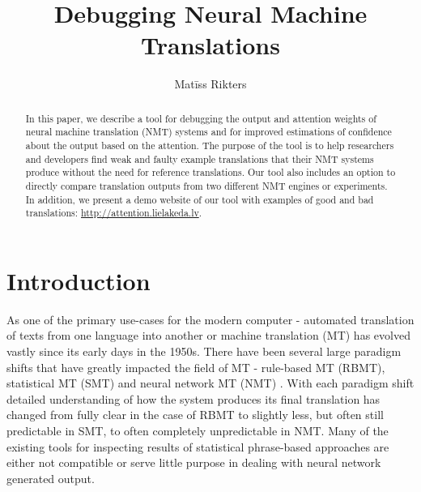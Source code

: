 \documentclass[runningheads,a4paper]{lncs/llncs}
\begin{document}
\mainmatter  \title{Debugging Neural Machine Translations}

\author{Matīss Rikters}


\maketitle

\begin{abstract}
In this paper, we describe a tool for debugging the output and attention weights of neural machine translation (NMT) systems and for improved estimations of confidence about the output based on the attention. The purpose of the tool is to help researchers and developers find weak and faulty example translations that their NMT systems produce without the need for reference translations. Our tool also includes an option to directly compare translation outputs from two different NMT engines or experiments. In addition, we present a demo website of our tool with examples of good and bad translations: \url{http://attention.lielakeda.lv}.
\end{abstract}



\section{Introduction}
\label{intro}

As one of the primary use-cases for the modern computer - automated translation of texts from one language into another or machine translation (MT) has evolved vastly since its early days in the 1950s. There have been several large paradigm shifts that have greatly impacted the field of MT - rule-based MT (RBMT), statistical MT (SMT) and neural network MT (NMT) \cite{nmt}. With each paradigm shift detailed understanding of how the system produces its final translation has changed from fully clear in the case of RBMT to slightly less, but often still predictable in SMT, to often completely unpredictable in NMT. Many of the existing tools for inspecting results of statistical phrase-based approaches are either not compatible or serve little purpose in dealing with neural network generated output.
\end{document}
